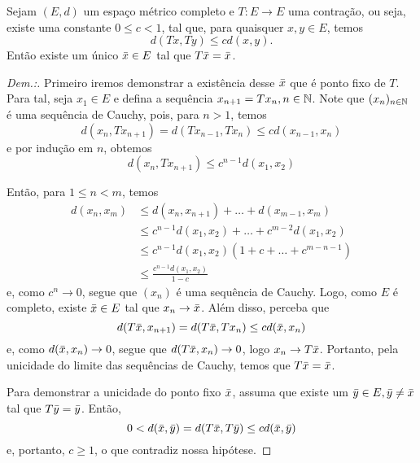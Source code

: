 \begin{theorem}
    \label{teoBanach}
    Sejam $(E, d)$ um espaço métrico completo e $T:E\to E$ uma contração, ou seja, existe uma constante $0\leq c < 1$, tal que, para quaisquer $x,y\in E$, temos
    \begin{equation}
        d(T x, T y) \leq cd(x, y).
    \end{equation}
Então existe um único $\Bar{x}\in E$ tal que $T\Bar{x} = \Bar{x}$.
\end{theorem}
\begin{proof}[Dem.:] 
    Primeiro iremos demonstrar a existência desse $\Bar{x}$ que é ponto fixo de $T$. Para tal, seja $x_1\in E$ e defina a sequência $x_{n+1}=Tx_n,n\in\mathbb{N}$. Note que $(x_n)_{n\in\mathbb{N}}$ é uma sequência de Cauchy, pois, para $n>1$, temos
    \begin{equation}
        d(x_n, T x_{n+1}) = d(Tx_{n-1}, T x_n)\leq cd(x_{n-1}, x_n)
    \end{equation}
    e por indução em $n$, obtemos
    \begin{equation}
        d(x_n, T x_{n+1})\leq c^{n-1}d(x_1, x_2)
    \end{equation}
    
    Então, para $1\leq n < m$, temos
    \begin{equation}
    \begin{split}
        d(x_n,x_m) &\leq d(x_n,x_{n+1})+\dots+d(x_{m-1},x_m) \\ 
        &\leq c^{n-1}d(x_1, x_2)+\dots+c^{m-2}d(x_1, x_2) \\ 
        &\leq c^{n-1}d(x_1,x_2)(1+c+\dots+c^{m-n-1}) \\ 
        &\leq \frac{c^{n-1}d(x_1, x_2)}{1-c}
    \end{split}
    \end{equation}
    e, como $c^n\to 0$, segue que $(x_n)$ é uma sequência de Cauchy. Logo, como $E$ é completo, existe $\Bar{x}\in E$ tal que $x_n\to\Bar{x}$. Além disso, perceba que
    \begin{equation}
        d(T\Bar{x},x_{n+1}) = d(T\Bar{x},Tx_n) \leq cd(\Bar{x}, x_n)
    \end{equation}
    e, como $d(\Bar{x},x_n)\to 0$, segue que $d(T\Bar{x},x_n)\to 0$, logo $x_n\to T\Bar{x}$. Portanto, pela unicidade do limite das sequências de Cauchy, temos que $T\Bar{x}=\Bar{x}$.
    
    Para demonstrar a unicidade do ponto fixo $\Bar{x}$, assuma que existe um $\Bar{y}\in E,\Bar{y}\neq\Bar{x}$ tal que $T\Bar{y}=\Bar{y}$. Então,
    \begin{equation}
        0 < d(\Bar{x},\Bar{y}) = d(T\Bar{x},T\Bar{y}) \leq cd(\Bar{x},\Bar{y})
    \end{equation}
    e, portanto, $c\geq 1$, o que contradiz nossa hipótese.
\end{proof}

